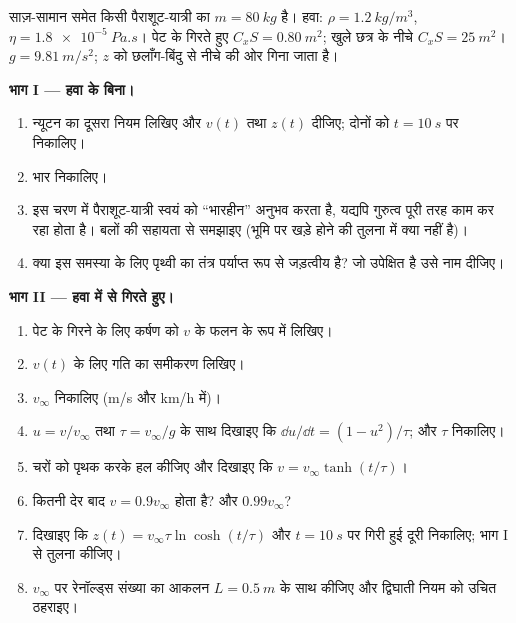 \begin{problem}
\label{pb:b1:newton-dynamics:1}
साज़-सामान समेत किसी पैराशूट-यात्री का  $m = \qty{80}{kg}$ है।
हवा: $\rho = \qty{1.2}{kg/m^3}$, $\eta = \qty{1.8e-5}{Pa.s}$। पेट के 
गिरते हुए $C_xS = \qty{0.80}{m^2}$; खुले छत्र के नीचे $C_xS =
\qty{25}{m^2}$। $g = \qty{9.81}{m/s^2}$; $z$ को छलाँग-बिंदु से नीचे की ओर
गिना जाता है।

\medskip
\noindent\textbf{भाग I --- हवा के बिना।}
\begin{enumerate}
  \item न्यूटन का दूसरा नियम लिखिए और $v(t)$ तथा $z(t)$ दीजिए; दोनों को
        $t = \qty{10}{s}$ पर निकालिए।
  \item भार निकालिए।
  \item इस चरण में पैराशूट-यात्री स्वयं को ``भारहीन'' अनुभव करता है, यद्यपि
        गुरुत्व पूरी तरह काम कर रहा होता है। बलों की सहायता से समझाइए (भूमि
        पर खड़े होने की तुलना में क्या नहीं है)।
  \item क्या इस समस्या के लिए पृथ्वी का तंत्र पर्याप्त रूप से जड़त्वीय है?
        जो उपेक्षित है उसे नाम दीजिए।
\end{enumerate}

\medskip
\noindent\textbf{भाग II --- हवा में से गिरते हुए।}
\begin{enumerate}[resume]
  \item पेट के  गिरने के लिए कर्षण  को $v$ के फलन के रूप में लिखिए।
  \item $v(t)$ के लिए गति का समीकरण लिखिए।
  \item {} $v_\infty$ निकालिए (\unit{m/s} और \unit{km/h} में)।
  \item $u = v/v_\infty$ तथा $\tau = v_\infty/g$ के साथ दिखाइए कि
        $\dd u/\dd t = (1 - u^2)/\tau$; और $\tau$ निकालिए।
  \item चरों को पृथक करके हल कीजिए और दिखाइए कि
        $v = v_\infty\tanh(t/\tau)$।
  \item कितनी देर बाद $v = 0.9v_\infty$ होता है? और $0.99v_\infty$?
  \item दिखाइए कि $z(t) = v_\infty\tau\ln\cosh(t/\tau)$ और
        $t = \qty{10}{s}$ पर गिरी हुई दूरी निकालिए; भाग I से तुलना कीजिए।
  \item $v_\infty$ पर रेनॉल्ड्स संख्या का आकलन $L = \qty{0.5}{m}$ के साथ
        कीजिए और द्विघाती नियम को उचित ठहराइए।
\end{enumerate}


\end{problem}
